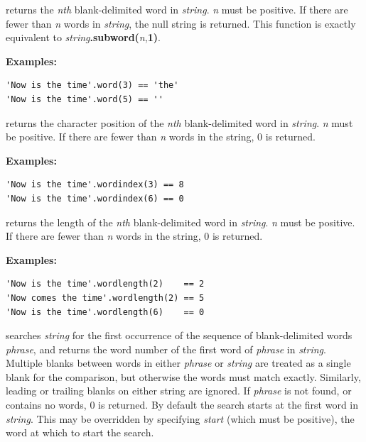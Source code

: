 \begin{description}
\item[word(n)]\label{refword}
returns the \emph{n}\emph{th} blank-delimited word in
\emph{string}.
\emph{n} must be positive.
If there are fewer than \emph{n} words in \emph{string}, the
null string is returned.
This function is exactly equivalent to
\emph{string}\textbf{.subword(}\emph{n},\textbf{1)}.
 
\textbf{Examples:}
\begin{lstlisting}
'Now is the time'.word(3) == 'the'
'Now is the time'.word(5) == ''
\end{lstlisting}

\item[wordindex(n)]\label{refwordind}
returns the character position of the \emph{n}\emph{th}
blank-delimited word in \emph{string}.
\emph{n} must be positive.
If there are fewer than \emph{n} words in the string, 0 is returned.
 
\textbf{Examples:}
\begin{lstlisting}
'Now is the time'.wordindex(3) == 8
'Now is the time'.wordindex(6) == 0
\end{lstlisting}

\item[wordlength(n)]\label{refwordlen}
returns the length of the \emph{n}\emph{th} blank-delimited word in
\emph{string}.
\emph{n} must be positive.
If there are fewer than \emph{n} words in the string, 0 is returned.
 
\textbf{Examples:}
\begin{lstlisting}
'Now is the time'.wordlength(2)    == 2
'Now comes the time'.wordlength(2) == 5
'Now is the time'.wordlength(6)    == 0
\end{lstlisting}

\item[wordpos(phrase [,start{]})]\label{refwordpos}
searches \emph{string} for the first occurrence of the sequence
of blank-delimited words \emph{phrase}, and returns the word number
of the first word of \emph{phrase} in \emph{string}.  Multiple
blanks between words in either \emph{phrase} or \emph{string}
are treated as a single blank for the comparison, but otherwise the
words must match exactly.  Similarly, leading or trailing blanks on
either string are ignored.
If \emph{phrase} is not found, or contains no words, 0 is returned.
 By default the search starts at the first word in \emph{string}.
This may be overridden by specifying \emph{start} (which must be
positive), the word at which to start the search.
 

\end{description}
